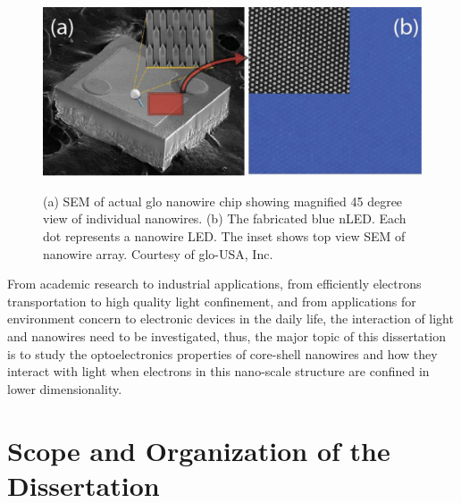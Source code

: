 \begin{figure}
  \caption{(a) SEM of actual glo nanowire chip showing magnified 45 degree view of  individual nanowires. (b) The fabricated blue nLED. Each dot represents a nanowire LED. The inset shows top view SEM of nanowire array. Courtesy of glo-USA, Inc.}
  \centering
  \includegraphics[width=\textwidth]{pictures/Introduction/GloLED}
  \label{GloLED}
\end{figure}

From academic research to industrial applications, from efficiently electrons
transportation to high quality light confinement, and from applications for
environment concern to electronic devices in the daily life, the interaction of
light and nanowires need to be investigated, thus, the major topic of this
dissertation is to study the optoelectronics properties of core-shell nanowires
and how they interact with light when electrons in this nano-scale structure
are confined in lower dimensionality.

\section{Scope and Organization of the Dissertation}

